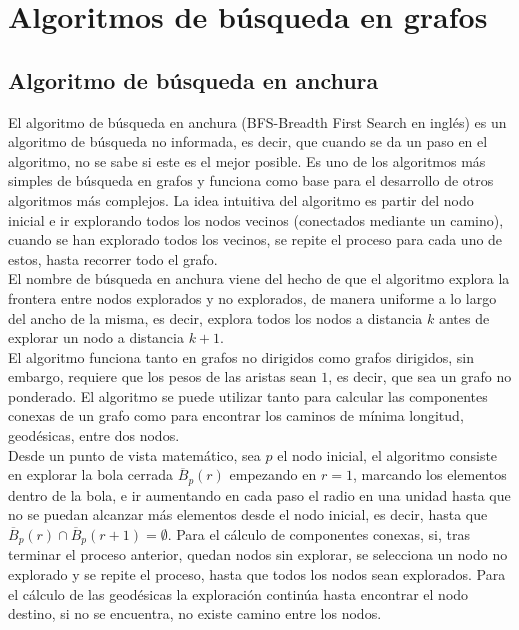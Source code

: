 
\chapter{Algoritmos de búsqueda en grafos}\label{ch:tercer-capitulo}

\section{Algoritmo de búsqueda en anchura}\label{BFS}

El algoritmo de búsqueda en anchura (BFS-Breadth First Search en inglés) es un algoritmo de búsqueda no informada, es decir, que cuando se da un paso en el algoritmo, no se sabe si este es el mejor posible. Es uno de los algoritmos más simples de búsqueda en grafos y funciona como base para el desarrollo de otros algoritmos más complejos. La idea intuitiva del algoritmo es partir del nodo inicial e ir explorando todos los nodos vecinos (conectados mediante un camino), cuando se han explorado todos los vecinos, se repite el proceso para cada uno de estos, hasta recorrer todo el grafo. \\

El nombre de búsqueda en anchura viene del hecho de que el algoritmo explora la frontera entre nodos explorados y no explorados, de manera uniforme a lo largo del ancho de la misma, es decir, explora todos los nodos a distancia $k$ antes de explorar un nodo a distancia $k+1$. \\

El algoritmo funciona tanto en grafos no dirigidos como grafos dirigidos, sin embargo, requiere que los pesos de las aristas sean $1$, es decir, que sea un grafo no ponderado. El algoritmo se puede utilizar tanto para calcular las componentes conexas de un grafo como para encontrar los caminos de mínima longitud, geodésicas, entre dos nodos. \\

Desde un punto de vista matemático, sea $p$ el nodo inicial, el algoritmo consiste en explorar la bola cerrada $\overline B_p(r)$ empezando en $r=1$, marcando los elementos dentro de la bola, e ir aumentando en cada paso el radio en una unidad hasta que no se puedan alcanzar más elementos desde el nodo inicial, es decir, hasta que $\overline B_p(r)\cap \overline B_p(r+1) = \emptyset$. Para el cálculo de componentes conexas, si, tras terminar el proceso anterior, quedan nodos sin explorar, se selecciona un nodo no explorado y se repite el proceso, hasta que todos los nodos sean explorados. Para el cálculo de las geodésicas la exploración continúa hasta encontrar el nodo destino, si no se encuentra, no existe camino entre los nodos.

